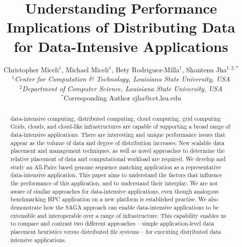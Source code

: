 \documentclass{rspublic}
\title[Understanding Performance Implications of Distributing Data for
Data-Intensive Applications]{Understanding Performance Implications of
Distributing Data for Data-Intensive Applications}
\author[Miceli, Miceli, Rodriguez-Milla, Jha]{ Christopher Miceli$^{1}$,
Michael Miceli$^{1}$, Bety Rodriguez-Milla$^{1}$, Shantenu Jha$^{1,2,*}$ \\
\small{\emph{$^{1}$Center for Computation \& Technology, Louisiana State
University, USA}} \\  \small{\emph{$^{2}$Department of Computer Science,
Louisiana State University, USA}} \\ {\footnotesize {\hspace{0.0 in}
$^*$Corresponding Author sjha@cct.lsu.edu}} }
\begin{document}
 \maketitle

\begin{abstract}{data-intensive computing, distributed computing,
cloud computing, grid computing} 
Grids, clouds, and cloud-like infrastructures are capable of supporting
a broad range of data-intensive applications. There are interesting
and unique performance issues that appear as the volume of data and
degree of distribution increases. New scalable data placement and
management techniques, as well as novel approaches to determine the
relative placement of data and computational workload are required. We
develop and study an All-Pairs based genome sequence matching
application as a representative data-intensive application.  This
paper aims to understand the factors that influence the performance of
this application, and to understand their interplay.  We are not aware
of similar approaches for data-intensive applications, even though
analogous benchmarking HPC application on a new platform is
established practise.  We also demonstrate how the SAGA approach can
enable data-intensive applications to be extensible and interoperable
over a range of infrastructure. This capability enables us to compare
and contrast two different approaches -- simple application-level data
placement heuristics versus distributed file systems -- for executing
distributed data intensive applications.

\end{abstract}
\end{document}
